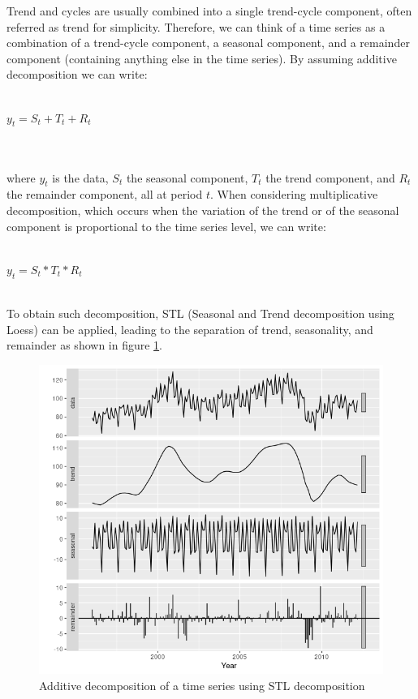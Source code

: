 \documentclass[a4paper]{article} %
\begin{document}
	Trend and cycles are usually combined into a single trend-cycle component, often referred as trend for simplicity.
	Therefore, we can think of a time series as a combination of a trend-cycle component, a seasonal component, and a remainder component (containing anything else in the time series).
	By assuming additive decomposition we can write:\\\\
	\centerline{$y_t = S_t + T_t + R_t$}\\\\
	where $y_t$ is the data, $S_t$ the seasonal component, $T_t$ the trend component, and $R_t$ the remainder component, all at period $t$. When considering multiplicative decomposition, which occurs when the variation of the trend or of the seasonal component is proportional to the time series level, we can write: \\\\
	\centerline{$y_t = S_t * T_t * R_t$}\\
	To obtain such decomposition, STL \cite{STL} (Seasonal and Trend decomposition using Loess) can be applied, leading to the separation of trend, seasonality, and remainder as shown in figure \ref{fig:stl}.
	\begin{figure}[H]
		\includegraphics[width=\linewidth]{img/sota_ts_additive_decomposition.png}
		\caption{Additive decomposition of a time series using STL decomposition}
		\label{fig:stl}
	\end{figure}
	
\end{document}
